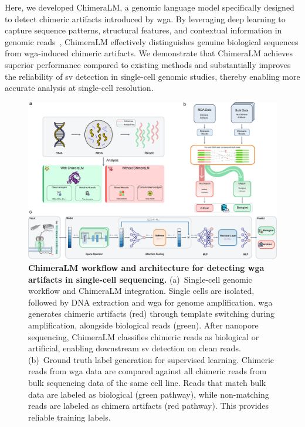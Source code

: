 \documentclass[pdflatex,sn-nature,lineno]{sn-jnl}%
\theoremstyle{thmstyleone}%
\theoremstyle{thmstyletwo}%
\theoremstyle{thmstylethree}%
\begin{document}
Here, we developed ChimeraLM, a genomic language model specifically designed to detect chimeric artifacts introduced by \gls{wga}.
By leveraging deep learning to capture sequence patterns, structural features, and contextual information in genomic reads~\cite{dalla2025nucleotide,zhou2023dnabert,nguyen2023hyenadna,consens2023transformers,li2024deepchopper}, ChimeraLM effectively distinguishes genuine biological sequences from \gls{wga}-induced chimeric artifacts.
We demonstrate that ChimeraLM achieves superior performance compared to existing methods and substantially improves the reliability of \gls{sv} detection in single-cell genomic studies, thereby enabling more accurate analysis at single-cell resolution.

\begin{figure}[p]
	\begin{center}
		\includegraphics[width=\textwidth]{final_figures/figure1}
	\end{center}
	\caption{{\bf ChimeraLM workflow and architecture for detecting \gls{wga} artifacts in single-cell sequencing.}
		(a)~Single-cell genomic workflow and ChimeraLM integration. Single cells are isolated, followed by DNA extraction and \gls{wga} for genome amplification. \gls{wga} generates chimeric artifacts (red) through template switching during amplification, alongside biological reads (green). After nanopore sequencing, ChimeraLM classifies chimeric reads as biological or artificial, enabling downstream \gls{sv} detection on clean reads.
		(b)~Ground truth label generation for supervised learning. Chimeric reads from \gls{wga} data are compared against all chimeric reads from bulk sequencing data of the same cell line. Reads that match bulk data are labeled as biological (green pathway), while non-matching reads are labeled as chimera artifacts (red pathway). This provides reliable training labels.
}
\end{figure}
\end{document}
